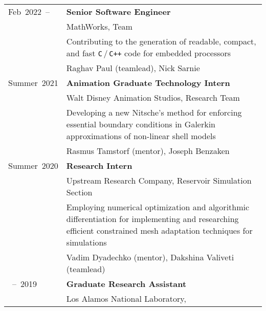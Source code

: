 \documentclass[a4paper,12pt]{article}
\makeatletter
\newcommand\myrefs{\multicolumn{1}{r}{\color{minorclr}References:}}
\newcommand\at{\multicolumn{1}{r}{\color{minorclr}@}}
\newcommand\myuline[1]{%
	\uline{\phantom{#1}}%
	\llap{\contour{bgclr}{#1}}%
}
\newcommand\xhref[2]{\href{#1}{\myuline{#2}}}
\makeatother
\begin{document}
	\begin{longtable}{>{\raggedright\arraybackslash}p{2.5cm}>{\raggedright\arraybackslash}p{14.6cm}}
		Feb~2022~--
			& \textbf{Senior Software Engineer}\vspace{2mm}\\
			\at & MathWorks, \xhref{https://www.mathworks.com/products/embedded-coder.html}{Embedded Coder} Team\vspace{2mm}\\
			& Contributing to the generation of readable, compact, and fast \texttt{C}\,/\,\texttt{C++} code for embedded processors\vspace{2mm}\\
			\myrefs & Raghav Paul (teamlead), Nick Sarnie\vspace{4mm}\\
		Summer~2021
			& \textbf{Animation Graduate Technology Intern}\vspace{2mm}\\
			\at & Walt Disney Animation Studios, \xhref{https://www.disneyanimation.com/technology}{WDAS Technology} Research Team\vspace{2mm}\\
			& Developing a new Nitsche's method for enforcing essential boundary conditions in Galerkin approximations of non-linear shell models\vspace{2mm}\\
			\myrefs & Rasmus Tamstorf (mentor), Joseph Benzaken\vspace{4mm}\\
		Summer~2020
			& \textbf{Research Intern}\vspace{2mm}\\
			\at & \xhref{https://corporate.exxonmobil.com}{ExxonMobil} Upstream Research Company, Reservoir Simulation Section\vspace{2mm}\\
			& Employing numerical optimization and algorithmic differentiation for implementing and researching efficient constrained mesh adaptation techniques for \xhref{https://en.wikipedia.org/wiki/Hydraulic_fracturing}{hydrofrac} simulations\vspace{2mm}\\
			\myrefs & Vadim Dyadechko (mentor), Dakshina Valiveti (teamlead) \vspace{4mm}\\			
		2018~--~2019
			& \textbf{Graduate Research Assistant}\vspace{2mm}\\
			\at & Los Alamos National Laboratory, \xhref{https://www.lanl.gov/org/ddste/aldsc/theoretical/applied-mathematics-plasma-physics}{Applied Mathematics \& Plasma Physics Group}\vspace{2mm}\\

\end{longtable}
\end{document}
